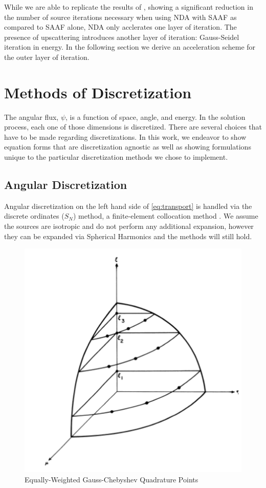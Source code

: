 While we are able to replicate the results of \cite{Wang2013}, showing a significant reduction in the number of source iterations necessary when using NDA with SAAF as compared to SAAF alone, NDA only acclerates one layer of iteration. The presence of upscattering introduces another layer of iteration: Gauss-Seidel iteration in energy. In the following section we derive an acceleration scheme for the outer layer of iteration.


\section{Methods of Discretization}
The angular flux, $\psi$, is a function of space, angle, and energy. In the solution process, each one of those dimensions is discretized. There are several choices that have to be made regarding discretizations. In this work, we endeavor to show equation forms that are discretization agnostic as well as showing formulations unique to the particular discretization methods we chose to implement. 

\subsection{Angular Discretization}

Angular discretization on the left hand side of \eqref{eq:transport} is handled via the discrete ordinates ($S_N$) method, a finite-element collocation method \cite{Lathrop1965}. We assume the sources are isotropic and do not perform any additional expansion, however they can be expanded via Spherical Harmonics and the methods will still hold. 

\begin{figure}[H]
    \centering
    \includegraphics[width=.5\textwidth]{fig/SNPoints.png}
    \caption{Equally-Weighted Gauss-Chebyshev Quadrature Points \cite{Lathrop1965}}
    \label{fig:SN}
\end{figure}

